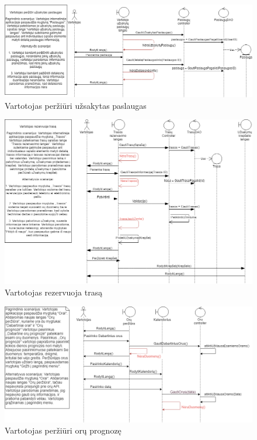 \documentclass[oneside]{VUMIFPSkursinis}
\begin{document}
			\begin{figure}[h]
    				\centering
    				\includegraphics[width=1\textwidth]{seq7.png}
    				\caption{Vartotojas peržiūri užsakytas paslaugas}
    				\label{fig:Vartotojas peržiūri užsakytas paslaugas}
			\end{figure}

			\begin{figure}[h]
    				\centering
    				\includegraphics[width=1\textwidth]{seq8.png}
    				\caption{Vartotojas rezervuoja trasą}
    				\label{fig:VartotojoUseCasel}
			\end{figure}

			\begin{figure}[h]
    				\centering
    				\includegraphics[width=1\textwidth]{seq10.png}
    				\caption{Vartotojas peržiūri orų prognozę}
    				\label{fig:Vartotojas peržiūri orų prognozę}
			\end{figure}
\end{document}
